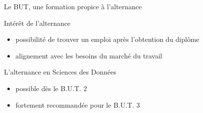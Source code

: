 \documentclass [xcolor=x11names,t] {beamer}
\begin{document}
\begin{frame}{Le BUT, une formation propice à l'alternance}
\begin{block}{Intérêt de l'alternance}
\begin{itemize}
    \item  possibilité de trouver un emploi après l'obtention du diplôme %
    \item alignement avec les besoins du marché du travail %
\end{itemize}

\end{block}

\begin{block}{L'alternance en Sciences des Données}
    \begin{itemize}
        \item possible dès le B.U.T. 2
        \item fortement recommandée pour le B.U.T. 3
    \end{itemize}
\end{block}

\end{frame}
\end{document}
